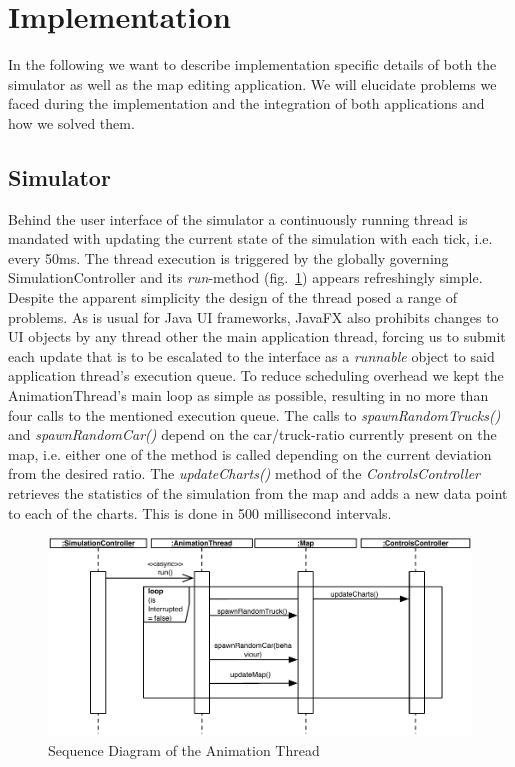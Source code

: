 \section{Implementation}
In the following we want to describe implementation specific details of both the simulator as well as the map editing application. We will elucidate problems we faced during the implementation and the integration of both applications and how we solved them. 
\subsection{Simulator}
Behind the user interface of the simulator a continuously running thread is mandated with updating the current state of the simulation with each tick, i.e. every 50ms. The thread execution is triggered by the globally governing SimulationController and its \textit{run}-method (fig.~\ref{fig:animthread}) appears refreshingly simple. Despite the apparent simplicity the design of the thread posed a range of problems. As is usual for Java UI frameworks, JavaFX also prohibits changes to UI objects by any thread other the main application thread, forcing us to submit each update that is to be escalated to the interface as a \textit{runnable} object to said application thread's execution queue. To reduce scheduling overhead we kept the AnimationThread's main loop as simple as possible, resulting in no more than four calls to the mentioned execution queue. The calls to \textit{spawnRandomTrucks()} and \textit{spawnRandomCar()} depend on the car/truck-ratio currently present on the map, i.e. either one of the method is called depending on the current deviation from the desired ratio. The \textit{updateCharts()} method of the \textit{ControlsController} retrieves the statistics of the simulation from the map and adds a new data point to each of the charts. This is done in 500 millisecond intervals.

\begin{figure}[h]
	\begin{center}
		\includegraphics[width=\textwidth]{img/SD_animThread.pdf}
		\caption[Sequence Diagram of the Animation Thread]{Sequence Diagram of the Animation Thread}
		\label{fig:animthread}
	\end{center}
\end{figure}

